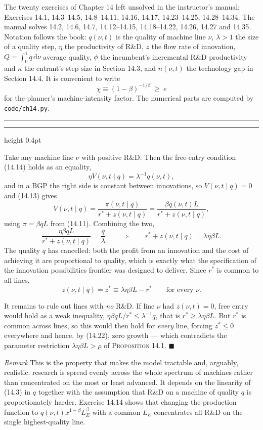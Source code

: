 \documentclass[11pt,letterpaper,reqno]{amsart}
\makeatletter
\newcommand{\dd}{\,\mathrm{d}}
\newcommand{\dt}[1]{\dot{#1}}
\newcommand{\as@head}[3]{%
  \par\addvspace{1.6ex}\penalty-200\relax
  \phantomsection
  \addcontentsline{toc}{subsection}{#1 #2\texorpdfstring{\ifx\relax#3\relax\else\quad #3\fi}{}}%
  {\color{RuleGrey}\hrule height 0.4pt}%
  \nobreak\vspace{0.8ex}\nobreak
  \noindent{\bfseries #1 #2}%
  \ifx\relax#3\relax\else\quad{\bfseries\itshape #3}\fi
  \par\nobreak\vspace{0.4ex}\nobreak
  \as@beginstatement
}
\newcommand{\as@beginstatement}{\begingroup\itshape\ignorespaces}
\newenvironment{aex}[2]{\as@head{Exercise}{#1}{#2}}{\par\addvspace{1.2ex}}
\newcommand{\rmk}[1]{%
  \par\vspace{0.6ex}%
  {\small\noindent\textit{Remark.}\hspace{0.5em}#1\par}%
  \vspace{0.4ex}%
}
\newcommand{\bk}[1]{\textup{\textsc{#1}}}
\renewcommand{\as@beginstatement}{\ignorespaces}
\makeatother
\begin{document}
\begin{center}
\begin{minipage}{0.86\textwidth}
\small
The twenty exercises of Chapter 14 left unsolved in the instructor's manual: Exercises 14.1,
14.3--14.5, 14.8--14.11, 14.16, 14.17, 14.23--14.25, 14.28--14.34.  The manual solves 14.2, 14.6,
14.7, 14.12--14.15, 14.18--14.22, 14.26, 14.27 and 14.35.  Notation follows the book: $q(\nu,t)$
is the quality of machine line $\nu$, $\lambda>1$ the size of a quality step, $\eta$ the
productivity of R\&D, $z$ the flow rate of innovation, $Q=\int_0^1q\dd\nu$ average quality,
$\phi$ the incumbent's incremental R\&D productivity and $\kappa$ the entrant's step size in
Section 14.3, and $n(\nu,t)$ the technology gap in Section 14.4.  It is convenient to write
\[
\chi\equiv(1-\beta)^{-1/\beta}\ \ge\ e
\]
for the planner's machine-intensity factor.  The numerical parts are computed by
\texttt{code/ch14.py}.
\end{minipage}
\end{center}

\bigskip
\hrule
\bigskip

\begin{aex}{14.1}{}
Take any machine line $\nu$ with positive R\&D.  Then the free-entry condition \bk{(14.14)} holds
as an equality,
\[
\eta V(\nu,t\mid q)=\lambda^{-1}q(\nu,t) ,
\]
and in a BGP the right side is constant between innovations, so $\dt V(\nu,t\mid q)=0$ and
\bk{(14.13)} gives
\[
V(\nu,t\mid q)=\frac{\pi(\nu,t\mid q)}{r^{*}+z(\nu,t\mid q)}=\frac{\beta q(\nu,t)L}{r^{*}+z(\nu,t\mid q)} ,
\]
using $\pi=\beta qL$ from \bk{(14.11)}.  Combining the two,
\[
\frac{\eta\beta q L}{r^{*}+z(\nu,t\mid q)}=\frac{q}{\lambda}
\qquad\Longrightarrow\qquad
r^{*}+z(\nu,t\mid q)=\lambda\eta\beta L .
\]
The quality $q$ has cancelled: both the profit from an innovation and the cost of achieving it
are proportional to quality, which is exactly what the specification of the innovation
possibilities frontier was designed to deliver.  Since $r^{*}$ is common to all lines,
\[
\boxed{\ z(\nu,t\mid q)=z^{*}\equiv\lambda\eta\beta L-r^{*}\qquad\text{for every }\nu .\ }
\]

It remains to rule out lines with \emph{no} R\&D.  If line $\nu$ had $z(\nu,t)=0$, free entry
would hold as a weak inequality, $\eta\beta qL/r^{*}\le\lambda^{-1}q$, that is
$r^{*}\ge\lambda\eta\beta L$.  But $r^{*}$ is common across lines, so this would then hold for
\emph{every} line, forcing $z^{*}\le0$ everywhere and hence, by \bk{(14.22)}, zero growth --- which
contradicts the parameter restriction $\lambda\eta\beta L>\rho$ of \bk{Proposition 14.1}.
$\blacksquare$

\rmk{This is the property that makes the model tractable and, arguably, realistic: research is
spread evenly across the whole spectrum of machines rather than concentrated on the most or least
advanced.  It depends on the linearity of \bk{(14.3)} in $q$ together with the assumption that
R\&D on a machine of quality $q$ is proportionately harder.  Exercise 14.14 shows that changing
the production function to $q(\nu,t)x^{1-\beta}L_E^{\beta}$ with a common $L_E$ concentrates all
R\&D on the single highest-quality line.}
\end{aex}
\end{document}
